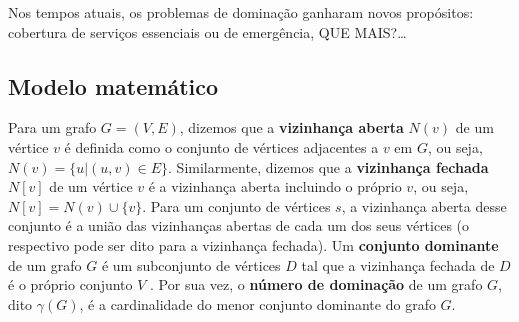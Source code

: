 \documentclass[11pt]{article}
\begin{document}
Nos tempos atuais, os problemas de dominação ganharam novos propósitos: cobertura de serviços essenciais ou de emergência, QUE MAIS?\ldots{}

\subsection{Modelo matemático}
\label{sec:org5e84075}
Para um grafo \(G = (V, E)\), dizemos que a \textbf{vizinhança aberta} \(N(v)\) de um vértice \(v\) é definida como o conjunto de vértices adjacentes a \(v\) em \(G\), ou seja, \(N(v) = \{u|(u, v) ∈ E\}\). Similarmente, dizemos que a \textbf{vizinhança fechada} \(N[v]\) de um vértice \(v\) é a vizinhança aberta incluindo o próprio \(v\), ou seja, \(N[v] = N(v) ∪ \{v\}\). Para um conjunto de vértices \(s\), a vizinhança aberta desse conjunto é a união das vizinhanças abertas de cada um dos seus vértices (o respectivo pode ser dito para a vizinhança fechada). Um \textbf{conjunto dominante} de um grafo \(G\) é um subconjunto de vértices \(D\) tal que a vizinhança fechada de \(D\) é o próprio conjunto \(V\) . Por sua vez, o \textbf{número de dominação} de um grafo \(G\), dito \(\gamma(G)\), é a cardinalidade do menor conjunto dominante do grafo \(G\).
\end{document}
